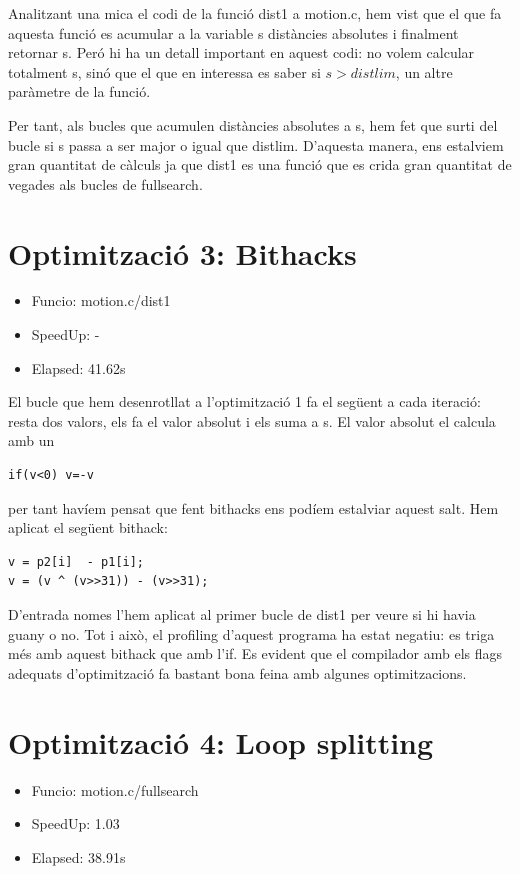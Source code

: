 Analitzant una mica el codi de la funció dist1 a motion.c, hem vist que el que fa aquesta funció es acumular a la variable s distàncies absolutes i finalment retornar s. Peró hi ha un detall important en aquest codi: no volem calcular totalment s, sinó que el que en interessa es saber si $s>distlim$, un altre paràmetre de la funció.

Per tant, als bucles que acumulen distàncies absolutes a s, hem fet que surti del bucle si s passa a ser major o igual que distlim. D'aquesta manera, ens estalviem gran quantitat de càlculs ja que dist1 es una funció que es crida gran quantitat de vegades als bucles de fullsearch.

\section{Optimitzaci\'o 3: Bithacks}
\begin{itemize}
\item{Funcio: motion.c/dist1}
\item{SpeedUp: -}
\item{Elapsed: 41.62s}
\end{itemize}

El bucle que hem desenrotllat a l'optimització 1 fa el següent a cada iteració: resta dos valors, els fa el valor absolut i els suma a s. El valor absolut el calcula amb un 

\begin{lstlisting}
if(v<0) v=-v 
\end{lstlisting}

per tant havíem pensat que fent bithacks ens podíem estalviar aquest salt. Hem aplicat el següent bithack:

\begin{lstlisting}
v = p2[i]  - p1[i];
v = (v ^ (v>>31)) - (v>>31);
\end{lstlisting}
 

D'entrada nomes l'hem aplicat al primer bucle de dist1 per veure si hi havia guany o no. Tot i això, el profiling d'aquest programa ha estat negatiu: es triga més amb aquest bithack que amb l'if. Es evident que el compilador amb els flags adequats d'optimització fa bastant bona feina amb algunes optimitzacions.
              

\section{Optimitzaci\'o 4: Loop splitting}
\begin{itemize}
\item{Funcio: motion.c/fullsearch}
\item{SpeedUp: 1.03}
\item {Elapsed: 38.91s}
\end{itemize}

